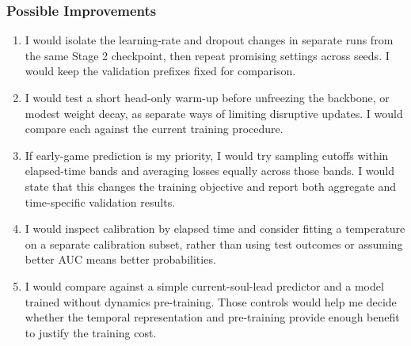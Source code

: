 \documentclass[11pt]{article}
\begin{document}
\subsubsection{Possible Improvements}
    \begin{enumerate}
        \item I would isolate the learning-rate and dropout changes in separate
        runs from the same Stage 2 checkpoint, then repeat promising settings
        across seeds. I would keep the validation prefixes fixed for comparison.
        \item I would test a short head-only warm-up before unfreezing the
        backbone, or modest weight decay, as separate ways of limiting disruptive
        updates. I would compare each against the current training procedure.
        \item If early-game prediction is my priority, I would try sampling
        cutoffs within elapsed-time bands and averaging losses equally across
        those bands. I would state that this changes the training objective
        and report both aggregate and time-specific validation results.
        \item I would inspect calibration by elapsed time and consider fitting
        a temperature on a separate calibration subset, rather than using test
        outcomes or assuming better AUC means better probabilities.
        \item I would compare against a simple current-soul-lead predictor and
        a model trained without dynamics pre-training. Those controls would
        help me decide whether the temporal representation and pre-training
        provide enough benefit to justify the training cost.
    \end{enumerate}
\end{document}
